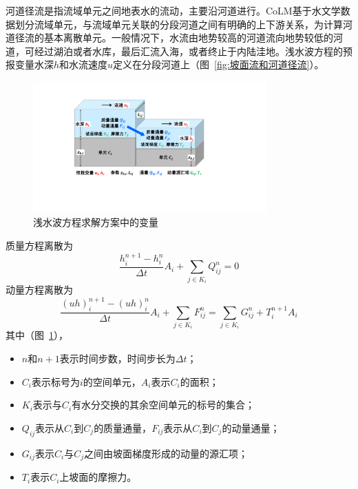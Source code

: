河道径流是指流域单元之间地表水的流动，主要沿河道进行。CoLM基于水文学数据划分流域单元，与流域单元关联的分段河道之间有明确的上下游关系，为计算河道径流的基本离散单元。一般情况下，水流由地势较高的河道流向地势较低的河道，可经过湖泊或者水库，最后汇流入海，或者终止于内陆洼地。浅水波方程的预报变量水深$h$和水流速度$u$定义在分段河道上（图~\ref{fig:坡面流和河道径流}）。

{
\begin{figure}[htbp]
\centering
\includegraphics[width=0.8\textwidth]{Figures/侧向流/浅水波方程求解.pdf}
\caption{浅水波方程求解方案中的变量}
\label{fig:浅水波方程求解}
\end{figure}
}

 质量方程离散为
  \begin{equation} \label{formula:mass_swe}
 \frac{ h^{n+1}_i - h^n_i}{\Delta t} A_i+\sum_{j\in K_i} Q^n_{ij} = 0
 \end{equation}
 动量方程离散为
 \begin{equation}
 \frac{ \left(uh\right)^{n+1}_i - \left(uh\right)^n_i}{\Delta t} A_i + \sum_{j\in K_i} F^n_{ij} = \sum_{j\in K_i} G^n_{ij}  + T^{n+1}_i  A_i \label{swe-d-2}
  \end{equation}
其中（图~\ref{fig:浅水波方程求解}），
\begin{itemize}
\item $n$和$n+1$表示时间步数，时间步长为$\Delta t$；
\item $C_i$表示标号为$i$的空间单元，$A_i$表示$C_i$的面积；
\item $K_i$表示与$C_i$有水分交换的其余空间单元的标号的集合；
\item $Q_{ij}$表示从$C_i$到$C_j$的质量通量，$F_{ij}$表示从$C_i$到$C_j$的动量通量；
\item $G_{ij}$表示$C_i$与$C_j$之间由坡面梯度形成的动量的源汇项；
\item $T_i$表示$C_i$上坡面的摩擦力。
\end{itemize}

